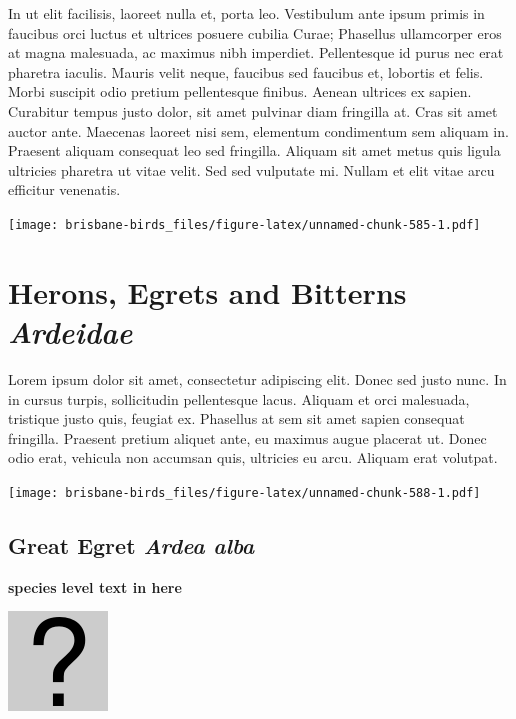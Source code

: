 \documentclass[]{book}
\let\origfigure\figure
\let\endorigfigure\endfigure
\renewenvironment{figure}[1][2] {
  \expandafter\origfigure\expandafter[H]
} {
  \endorigfigure
}
\begin{document}
In ut elit facilisis, laoreet nulla et, porta leo. Vestibulum ante ipsum
primis in faucibus orci luctus et ultrices posuere cubilia Curae;
Phasellus ullamcorper eros at magna malesuada, ac maximus nibh
imperdiet. Pellentesque id purus nec erat pharetra iaculis. Mauris velit
neque, faucibus sed faucibus et, lobortis et felis. Morbi suscipit odio
pretium pellentesque finibus. Aenean ultrices ex sapien. Curabitur
tempus justo dolor, sit amet pulvinar diam fringilla at. Cras sit amet
auctor ante. Maecenas laoreet nisi sem, elementum condimentum sem
aliquam in. Praesent aliquam consequat leo sed fringilla. Aliquam sit
amet metus quis ligula ultricies pharetra ut vitae velit. Sed sed
vulputate mi. Nullam et elit vitae arcu efficitur venenatis.

\begin{figure}
\centering
\texttt{[image: brisbane-birds\_files/figure-latex/unnamed-chunk-585-1.pdf]}
\caption{\label{fig:unnamed-chunk-585}insert figure caption}
\end{figure}

\chapter{\texorpdfstring{Herons, Egrets and Bitterns
\emph{Ardeidae}}{Herons, Egrets and Bitterns Ardeidae}}\label{herons-egrets-and-bitterns-ardeidae}

Lorem ipsum dolor sit amet, consectetur adipiscing elit. Donec sed justo
nunc. In in cursus turpis, sollicitudin pellentesque lacus. Aliquam et
orci malesuada, tristique justo quis, feugiat ex. Phasellus at sem sit
amet sapien consequat fringilla. Praesent pretium aliquet ante, eu
maximus augue placerat ut. Donec odio erat, vehicula non accumsan quis,
ultricies eu arcu. Aliquam erat volutpat.

\texttt{[image: brisbane-birds\_files/figure-latex/unnamed-chunk-588-1.pdf]}

\section{\texorpdfstring{Great Egret \emph{Ardea
alba}}{Great Egret Ardea alba}}\label{great-egret-ardea-alba}

\textbf{species level text in here}

\begin{figure}
\centering
\includegraphics{assets/missing.png}
\caption{No image for species}
\end{figure}
\end{document}
